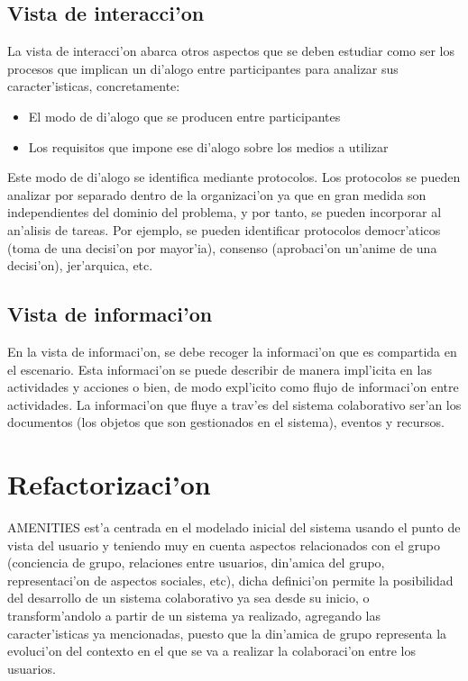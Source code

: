 \subsection{Vista de interacci'on}
La vista de interacci'on abarca otros aspectos que se deben estudiar como ser los procesos que implican un di'alogo entre participantes para analizar sus caracter'isticas, concretamente: 

\begin{itemize}
	\item El modo de di'alogo que se producen entre participantes 
	\item Los requisitos que impone ese di'alogo sobre los medios a utilizar
\end{itemize}

\medskip
Este modo de di'alogo se identifica mediante protocolos. Los protocolos se pueden analizar por separado dentro de la organizaci'on ya que en gran medida son independientes del dominio del problema, y por tanto, se pueden incorporar al an'alisis de tareas. Por ejemplo, se pueden identificar protocolos democr'aticos (toma de una decisi'on por mayor'ia), consenso (aprobaci'on un'anime de una decisi'on), jer'arquica, etc.

\subsection{Vista de informaci'on}

En la vista de informaci'on, se debe recoger la informaci'on que es compartida en el escenario. Esta informaci'on se puede describir de manera impl'icita en las actividades y acciones o bien, de modo expl'icito como flujo de informaci'on entre actividades. La informaci'on que fluye a trav'es del sistema colaborativo ser'an los documentos (los objetos que son gestionados en el sistema), eventos y recursos. 

\section{Refactorizaci'on}

AMENITIES est'a centrada en el modelado inicial del sistema usando el punto de vista del usuario y teniendo muy en cuenta aspectos relacionados con el grupo (conciencia de grupo, relaciones entre usuarios, din'amica del grupo, representaci'on de aspectos sociales, etc), dicha definici'on permite la posibilidad del desarrollo de un sistema colaborativo ya sea desde su inicio, o transform'andolo a partir de un sistema ya realizado, agregando las caracter'isticas ya mencionadas, puesto que la din'amica de grupo representa la evoluci'on del contexto en el que se va a realizar la colaboraci'on entre los usuarios.

